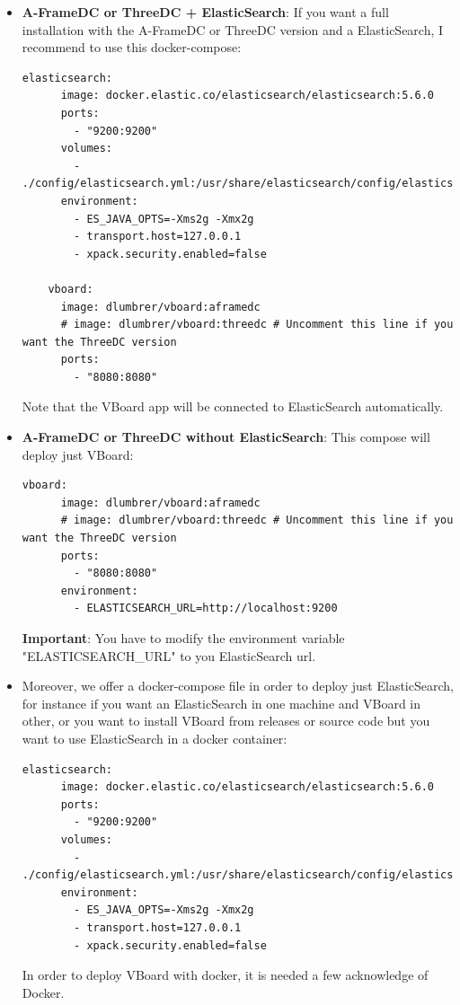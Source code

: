 \documentclass[a4paper, 12pt]{book}
\begin{document}
\begin{itemize}
    \item \textbf{A-FrameDC or ThreeDC + ElasticSearch}: If you want a full installation with the A-FrameDC or ThreeDC version and a ElasticSearch, I recommend to use this docker-compose:
    \begin{lstlisting}[frame=single]
    elasticsearch:
      image: docker.elastic.co/elasticsearch/elasticsearch:5.6.0
      ports:
        - "9200:9200"
      volumes:
        - ./config/elasticsearch.yml:/usr/share/elasticsearch/config/elasticsearch.yml:ro
      environment:
        - ES_JAVA_OPTS=-Xms2g -Xmx2g
        - transport.host=127.0.0.1
        - xpack.security.enabled=false
    
    vboard:
      image: dlumbrer/vboard:aframedc
      # image: dlumbrer/vboard:threedc # Uncomment this line if you want the ThreeDC version
      ports:
        - "8080:8080"
    \end{lstlisting}
    Note that the VBoard app will be connected to ElasticSearch automatically.
    
    \item \textbf{A-FrameDC or ThreeDC without ElasticSearch}: This compose will deploy just VBoard:
    \begin{lstlisting}[frame=single]
    vboard:
      image: dlumbrer/vboard:aframedc
      # image: dlumbrer/vboard:threedc # Uncomment this line if you want the ThreeDC version
      ports:
        - "8080:8080"
      environment:
        - ELASTICSEARCH_URL=http://localhost:9200
    \end{lstlisting}
    \textbf{Important}: You have to modify the environment variable "ELASTICSEARCH\_URL" to you ElasticSearch url.
    
    \item Moreover, we offer a docker-compose file in order to deploy just ElasticSearch, for instance if you want an ElasticSearch in one machine and VBoard in other, or you want to install VBoard from releases or source code but you want to use ElasticSearch in a docker container:
    \begin{lstlisting}[frame=single]
    elasticsearch:
      image: docker.elastic.co/elasticsearch/elasticsearch:5.6.0
      ports:
        - "9200:9200"
      volumes:
        - ./config/elasticsearch.yml:/usr/share/elasticsearch/config/elasticsearch.yml:ro
      environment:
        - ES_JAVA_OPTS=-Xms2g -Xmx2g
        - transport.host=127.0.0.1
        - xpack.security.enabled=false
    \end{lstlisting}
    
In order to deploy VBoard with docker, it is needed a few acknowledge of Docker.




\end{itemize}
\end{document}
